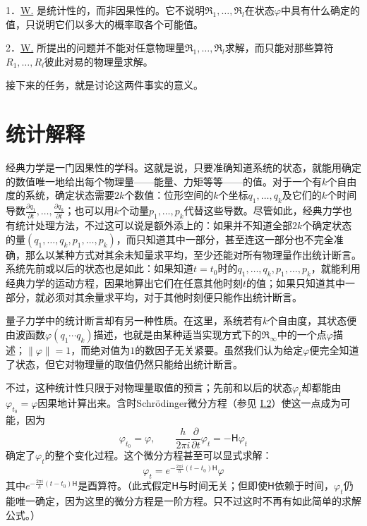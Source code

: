 \documentclass[fontsize=13pt,twoside,openany,headings=normal,parskip=false,bookmarkpackage=false,DIV=calc]{scrbook}
\begin{document}
1．\hyperref[post:III.1.W]{W.} 是统计性的，而非因果性的。它不说明$\mathfrak R_1,\allowbreak \ldots,\allowbreak \mathfrak R_l$在状态$\varphi$中具有什么确定的值，只说明它们以多大的概率取各个可能值。

2．\hyperref[post:III.1.W]{W.} 所提出的问题并不能对任意物理量$\mathfrak R_1,\allowbreak \ldots,\allowbreak \mathfrak R_l$求解，而只能对那些算符$R_1,\allowbreak \ldots,\allowbreak R_l$彼此对易的物理量求解。

接下来的任务，就是讨论这两件事实的意义。

\section{统计解释}\label{sec:III.2}
经典力学是一门因果性的学科。这就是说，只要准确知道系统的状态，就能用确定的数值唯一地给出每个物理量——能量、力矩等等——的值。对于一个有$k$个自由度的系统，确定状态需要$2k$个数值：位形空间的$k$个坐标$q_1,\allowbreak \ldots,\allowbreak q_k$及它们的$k$个时间导数$\frac{\partial q_1}{\partial t},\allowbreak \ldots,\allowbreak \frac{\partial q_k}{\partial t}$；也可以用$k$个动量$p_1,\allowbreak \ldots,\allowbreak p_k$代替这些导数。尽管如此，经典力学也有统计处理方法，不过这可以说是额外添上的：如果并不知道全部$2k$个确定状态的量$(q_1,\allowbreak \ldots,\allowbreak q_k,\allowbreak p_1,\allowbreak \ldots,\allowbreak p_k)$，而只知道其中一部分，甚至连这一部分也不完全准确，那么以某种方式对其余未知量求平均，至少还能对所有物理量作出统计断言。系统先前或以后的状态也是如此：\hypertarget{origpage-108}{}\label{origpage-108}如果知道$t=t_0$时的$q_1,\allowbreak \ldots,\allowbreak q_k,\allowbreak p_1,\allowbreak \ldots,\allowbreak p_k$，就能利用经典力学的运动方程，因果地算出它们在任意其他时刻$t$的值；如果只知道其中一部分，就必须对其余量求平均，对于其他时刻便只能作出统计断言。

量子力学中的统计断言却有另一种性质。在这里，系统若有$k$个自由度，其状态便由波函数$\varphi(q_1\cdots q_k)$描述，也就是由某种适当实现方式下的$\mathfrak R_\infty$中的一个点$\varphi$描述；$\|\varphi\|=1$，而绝对值为$1$的数因子无关紧要。虽然我们认为给定$\varphi$便完全知道了状态，但它对物理量的取值仍然只能给出统计断言。

不过，这种统计性只限于对物理量取值的预言；先前和以后的状态$\varphi_t$却都能由$\varphi_{t_0}=\varphi$因果地计算出来。含时Schrödinger微分方程（参见 \hyperref[sec:I.2]{I.2}）使这一点成为可能，因为
\[
\varphi_{t_0}=\varphi,\qquad
\frac h{2\pi i}\frac\partial{\partial t}\varphi_t=-\mathsf H\varphi_t
\]
确定了$\varphi_t$的整个变化过程。这个微分方程甚至可以显式求解：
\[
\varphi_t=e^{-\frac{2\pi i}h(t-t_0)\mathsf H}\varphi
\]
其中$e^{-\frac{2\pi i}h(t-t_0)\mathsf H}$是酉算符。（此式假定$\mathsf H$与时间无关；但即使$\mathsf H$依赖于时间，$\varphi_t$仍能唯一确定，因为这里的微分方程是一阶方程。只不过这时不再有如此简单的求解公式。）
\end{document}
